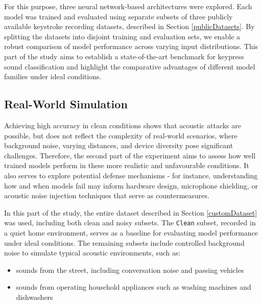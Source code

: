 \documentclass[a4paper,11pt,twoside]{report}
\theoremstyle{definition}
\begin{document}

For this purpose, three neural network-based architectures were explored. Each model was trained and evaluated using separate subsets of three publicly available keystroke recording datasets, described in Section \ref{publicDatasets}. By splitting the datasets into disjoint training and evaluation sets, we enable a robust comparison of model performance across varying input distributions. This part of the study aims to establish a state-of-the-art benchmark for keypress sound classification and highlight the comparative advantages of different model families under ideal conditions.

\subsection{Real-World Simulation}

Achieving high accuracy in clean conditions shows that acoustic attacks are possible, but does not reflect the complexity of real-world scenarios, where background noise, varying distances, and device diversity pose significant challenges. Therefore, the second part of the experiment aims to assess how well trained models perform in these more realistic and unfavourable conditions. It also serves to explore potential defense mechanisms - for instance, understanding how and when models fail may inform hardware design, microphone shielding, or acoustic noise injection techniques that serve as countermeasures.

In this part of the study, the entire dataset described in Section \ref{customDataset} was used, including both clean and noisy subsets. The \texttt{Clean} subset, recorded in a quiet home environment, serves as a baseline for evaluating model performance under ideal conditions. The remaining subsets include controlled background noise to simulate typical acoustic environments, such as:
\begin{itemize}
  \item sounds from the street, including conversation noise and passing vehicles
  \item sounds from operating household appliances such as washing machines and dishwashers
\end{itemize}
\end{document}
